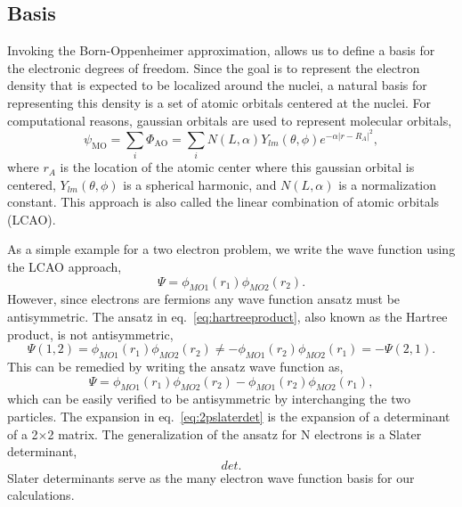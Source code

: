 \subsection{Basis}
Invoking the Born-Oppenheimer approximation, allows us to define a basis for the electronic degrees of freedom.
Since the goal is to represent the electron density that is expected to be localized around the nuclei, a natural basis for representing this density is a set of atomic orbitals centered at the nuclei.
For computational reasons, gaussian orbitals are used to represent molecular orbitals,
\begin{equation}
\psi_{\textrm{MO}} = \sum_{i} \Phi_{\textrm{AO}} = \sum_{i} N(L, \alpha) Y_{lm}(\theta, \phi) e^{-\alpha |r - R_A|^2},
\end{equation}
where $r_A$ is the location of the atomic center where this gaussian orbital is centered, $Y_{lm}(\theta, \phi)$ is a spherical harmonic, and $N(L, \alpha)$ is a normalization constant.
This approach is also called the linear combination of atomic orbitals (LCAO).

As a simple example for a two electron problem, we write the wave function using the LCAO approach,
\begin{equation}
\Psi = \phi_{MO1}(r_1) \phi_{MO2}(r_2).
\label{eq:hartreeproduct}
\end{equation}
However, since electrons are fermions any wave function ansatz must be antisymmetric.
The ansatz in eq.~\ref{eq:hartreeproduct}, also known as the Hartree product, is not antisymmetric,
\begin{equation}
\Psi(1,2) = \phi_{MO1}(r_1) \phi_{MO2}(r_2) \neq -\phi_{MO1}(r_2) \phi_{MO2}(r_1) = -\Psi(2,1).
\end{equation}
This can be remedied by writing the ansatz wave function as, 
\begin{equation}
\Psi = \phi_{MO1}(r_1) \phi_{MO2}(r_2) - \phi_{MO1}(r_2) \phi_{MO2}(r_1),
\label{eq:2pslaterdet}
\end{equation}
which can be easily verified to be antisymmetric by interchanging the two particles.
The expansion in eq.~\ref{eq:2pslaterdet} is the expansion of a determinant of a 2$\times$2 matrix.
The generalization of the ansatz for N electrons is a Slater determinant,
\begin{equation}
det.
\end{equation}
Slater determinants serve as the many electron wave function basis for our calculations.
